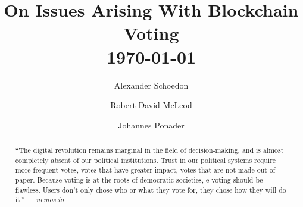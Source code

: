 \documentclass[9pt,oneside]{amsart}
\title{On Issues Arising With Blockchain Voting \\ {\smaller \today}}
\author{
    Alexander Schoedon
}
\author{
    Robert David McLeod
}
\author{
    Johannes Ponader
}
\begin{document}
\pagecolor{lightblue}

\begin{abstract}
\enquote{The digital revolution remains marginal in the field of decision-making, and is almost completely absent of our political institutions. Trust in our political systems require more frequent votes, votes that have greater impact, votes that are not made out of paper. Because voting is at the roots of democratic societies, e-voting should be flawless. Users don't only chose who or what they vote for, they chose how they will do it.} --- \textit{nemos.io} %
\end{abstract}

\maketitle
\end{document}
